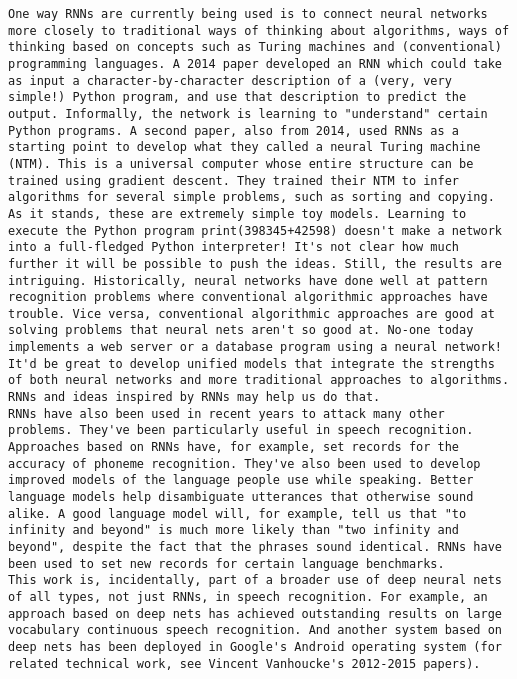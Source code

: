 \begin{lstlisting}
One way RNNs are currently being used is to connect neural networks more closely to traditional ways of thinking about algorithms, ways of thinking based on concepts such as Turing machines and (conventional) programming languages. A 2014 paper developed an RNN which could take as input a character-by-character description of a (very, very simple!) Python program, and use that description to predict the output. Informally, the network is learning to "understand" certain Python programs. A second paper, also from 2014, used RNNs as a starting point to develop what they called a neural Turing machine (NTM). This is a universal computer whose entire structure can be trained using gradient descent. They trained their NTM to infer algorithms for several simple problems, such as sorting and copying.
As it stands, these are extremely simple toy models. Learning to execute the Python program print(398345+42598) doesn't make a network into a full-fledged Python interpreter! It's not clear how much further it will be possible to push the ideas. Still, the results are intriguing. Historically, neural networks have done well at pattern recognition problems where conventional algorithmic approaches have trouble. Vice versa, conventional algorithmic approaches are good at solving problems that neural nets aren't so good at. No-one today implements a web server or a database program using a neural network! It'd be great to develop unified models that integrate the strengths of both neural networks and more traditional approaches to algorithms. RNNs and ideas inspired by RNNs may help us do that.
RNNs have also been used in recent years to attack many other problems. They've been particularly useful in speech recognition. Approaches based on RNNs have, for example, set records for the accuracy of phoneme recognition. They've also been used to develop improved models of the language people use while speaking. Better language models help disambiguate utterances that otherwise sound alike. A good language model will, for example, tell us that "to infinity and beyond" is much more likely than "two infinity and beyond", despite the fact that the phrases sound identical. RNNs have been used to set new records for certain language benchmarks.
This work is, incidentally, part of a broader use of deep neural nets of all types, not just RNNs, in speech recognition. For example, an approach based on deep nets has achieved outstanding results on large vocabulary continuous speech recognition. And another system based on deep nets has been deployed in Google's Android operating system (for related technical work, see Vincent Vanhoucke's 2012-2015 papers).

\end{lstlisting}
